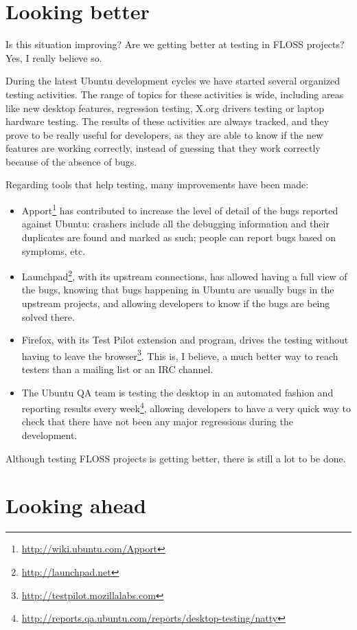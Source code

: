 \section*{Looking better}

Is this situation improving? Are we getting better at testing in FLOSS projects? Yes, I really believe so.

During the latest Ubuntu development cycles we have started several organized testing activities. The range of topics for these activities is wide, including areas like new desktop features, regression testing, X.org drivers testing or laptop hardware testing. The results of these activities are always tracked, and they prove to be really useful for developers, as they are able to know if the new features are working correctly, instead of guessing that they work correctly because of the absence of bugs.

Regarding tools that help testing, many improvements have been made:
\begin{itemize}
 \item Apport\footnote{\url{http://wiki.ubuntu.com/Apport}} has contributed to increase the level of detail of the bugs reported against Ubuntu: crashers include all the debugging information and their duplicates are found and marked as such; people can report bugs based on symptoms, etc.
 \item Launchpad\footnote{\url{http://launchpad.net}}, with its upstream connections, has allowed having a full view of the bugs, knowing that bugs happening in Ubuntu are usually bugs in the upstream projects, and allowing developers to know if the bugs are being solved there. 
 \item Firefox, with its Test Pilot extension and program, drives the testing without having to leave the browser\footnote{\url{http://testpilot.mozillalabs.com}}. This is, I believe, a much better way to reach testers than a mailing list or an IRC channel.
 \item The Ubuntu QA team is testing the desktop in an automated fashion and reporting results every week\footnote{\url{http://reports.qa.ubuntu.com/reports/desktop-testing/natty}}, allowing developers to have a very quick way to check that there have not been any major regressions during the development.
\end{itemize}

Although testing FLOSS projects is getting better, there is still a lot to be done.

\section*{Looking ahead}

